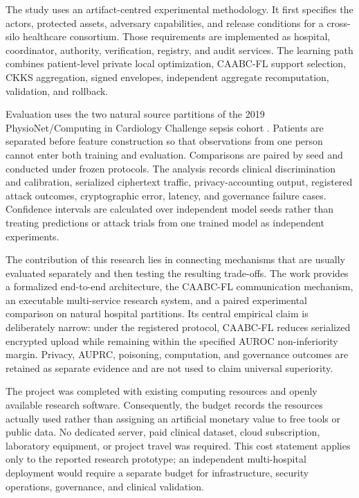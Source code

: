 
The study uses an artifact-centred experimental methodology. It first specifies
the actors, protected assets, adversary capabilities, and release conditions for a
cross-silo healthcare consortium. Those requirements are implemented as hospital,
coordinator, authority, verification, registry, and audit services. The learning
path combines patient-level private local optimization, CAABC-FL support
selection, CKKS aggregation, signed envelopes, independent aggregate
recomputation, validation, and rollback.

Evaluation uses the two natural source partitions of the 2019
PhysioNet/Computing in Cardiology Challenge sepsis cohort
\cite{reyna2020early,physionet2019sepsis}. Patients are separated before feature
construction so that observations from one person cannot enter both training and
evaluation. Comparisons are paired by seed and conducted under frozen protocols.
The analysis records clinical discrimination and calibration, serialized
ciphertext traffic, privacy-accounting output, registered attack outcomes,
cryptographic error, latency, and governance failure cases. Confidence intervals
are calculated over independent model seeds rather than treating predictions or
attack trials from one trained model as independent experiments.


The contribution of this research lies in connecting mechanisms that are usually
evaluated separately and then testing the resulting trade-offs. The work provides
a formalized end-to-end architecture, the CAABC-FL communication mechanism, an
executable multi-service research system, and a paired experimental comparison on
natural hospital partitions. Its central empirical claim is deliberately narrow:
under the registered protocol, CAABC-FL reduces serialized encrypted upload while
remaining within the specified AUROC non-inferiority margin. Privacy, AUPRC,
poisoning, computation, and governance outcomes are retained as separate evidence
and are not used to claim universal superiority.


The project was completed with existing computing resources and openly available
research software. Consequently, the budget records the resources actually used
rather than assigning an artificial monetary value to free tools or public data.
No dedicated server, paid clinical dataset, cloud subscription, laboratory
equipment, or project travel was required. This cost statement applies only to
the reported research prototype; an independent multi-hospital deployment would
require a separate budget for infrastructure, security operations, governance,
and clinical validation.

